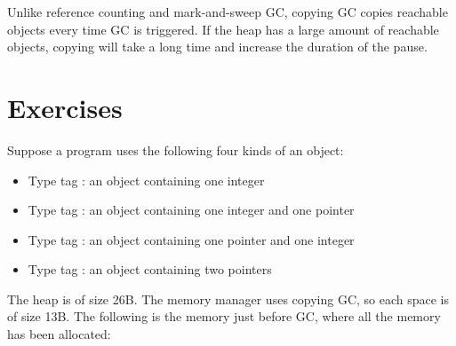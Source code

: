 Unlike reference counting and mark-and-sweep GC, copying GC copies reachable
objects every time GC is triggered. If the heap has a large amount of reachable
objects, copying will take a long time and increase the duration of the pause.

\section{Exercises}

\begin{exercise}

Suppose a program uses the following four kinds of an object:

\begin{itemize}
\item Type tag : an object containing one integer
\item Type tag : an object containing one integer and one pointer
\item Type tag : an object containing one pointer and one integer
\item Type tag : an object containing two pointers
\end{itemize}

The heap is of size 26B. The memory manager uses copying GC, so each space is of
size 13B. The following is the memory just before GC, where all the memory
has been allocated:


\end{exercise}
